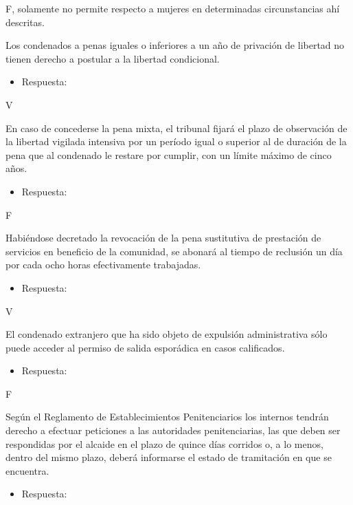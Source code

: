 \documentclass[letterpaper, 11pt]{article}
\begin{document}
F, solamente no permite respecto a mujeres en determinadas
circunstancias ahí descritas.



Los condenados a penas iguales o inferiores a un año de privación de
libertad no tienen derecho a postular a la libertad condicional.


\begin{itemize}
\item Respuesta:
\end{itemize}

V


En caso de concederse la pena mixta, el tribunal fijará el plazo de
observación de la libertad vigilada intensiva por un período igual o
superior al de duración de la pena que al condenado le restare por
cumplir, con un límite máximo de cinco años.


\begin{itemize}
\item Respuesta:
\end{itemize}

F



Habiéndose decretado la revocación de la pena sustitutiva de
prestación de servicios en beneficio de la comunidad, se abonará al
tiempo de reclusión un día por cada ocho horas efectivamente
trabajadas.


\begin{itemize}
\item Respuesta:
\end{itemize}

V


El condenado extranjero que ha sido objeto de expulsión administrativa
sólo puede acceder al permiso de salida esporádica en casos
calificados.


\begin{itemize}
\item Respuesta:
\end{itemize}

F



Según el Reglamento de Establecimientos Penitenciarios los internos
tendrán derecho a efectuar peticiones a las autoridades
penitenciarias, las que deben ser respondidas por el alcaide en el
plazo de quince días corridos o, a lo menos, dentro del mismo plazo,
deberá informarse el estado de tramitación en que se encuentra.


\begin{itemize}
\item Respuesta:
\end{itemize}
\end{document}
